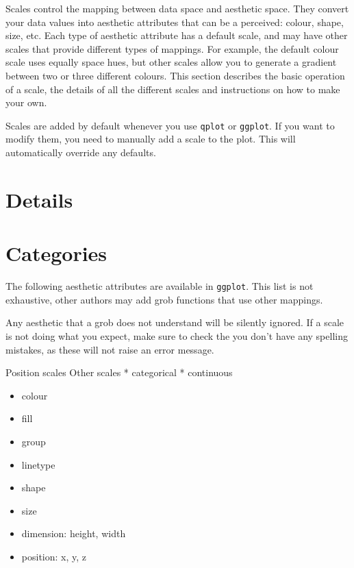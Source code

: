 Scales control the mapping between data space and aesthetic space.  They convert your data values into aesthetic attributes that can be a perceived: colour, shape, size, etc.  Each type of aesthetic attribute has a default scale, and may have other scales that provide different types of mappings.  For example, the default colour scale uses equally space hues, but other scales allow you to generate a gradient between two or three different colours.  This section describes the basic operation of a scale, the details of all the different scales and instructions on how to make your own.

Scales are added by default whenever you use {\tt qplot} or {\tt ggplot}.  If you want to modify them, you need to manually add a scale to the plot.  This will automatically override any defaults.


\section{Details}\label{sec:details}

\section{Categories}\label{sec:categories} 

The following aesthetic attributes are available in {\tt ggplot}.  This list is not exhaustive, other authors may add grob functions that use other mappings.  

Any aesthetic that a grob does not understand will be silently ignored.  If a scale is not doing what you expect, make sure to check the you don't have any spelling mistakes, as these will not raise an error message.

Position scales
Other scales
 * categorical
 * continuous

\begin{itemize}
	\item colour
	\item fill
	\item group
	\item linetype
	\item shape
	\item size
	\item dimension: height, width
	\item position: x, y, z
\end{itemize}

